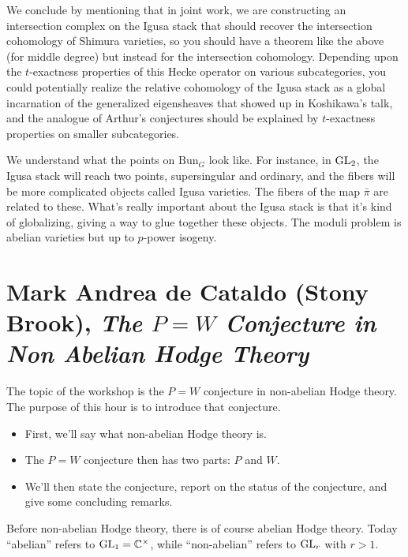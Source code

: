 \documentclass[reqno]{amsart} 
\begin{document}
We conclude by mentioning that in joint work, we are constructing an intersection complex on the Igusa stack that should recover the intersection cohomology of Shimura varieties, so you should have a theorem like the above (for middle degree) but instead for the intersection cohomology.  Depending upon the $t$-exactness properties of this Hecke operator on various subcategories, you could potentially realize the relative cohomology of the Igusa stack as a global incarnation of the generalized eigensheaves that showed up in Koshikawa's talk, and the analogue of Arthur's conjectures should be explained by $t$-exactness properties on smaller subcategories.

\begin{remark}
  We understand what the points on $\mathrm{Bun}_G$ look like.  For instance, in $\operatorname{GL}_2$, the Igusa stack will reach two points, supersingular and ordinary, and the fibers will be more complicated objects called Igusa varieties.  The fibers of the map $\bar{\pi}$ are related to these.  What's really important about the Igusa stack is that it's kind of globalizing, giving a way to glue together these objects.  The moduli problem is abelian varieties but up to $p$-power isogeny.
\end{remark}


\part{Mark Andrea de Cataldo (Stony Brook), \emph{The $P=W$ Conjecture in Non Abelian Hodge Theory}}


The topic of the workshop is the $P = W$ conjecture in non-abelian Hodge theory.  The purpose of this hour is to introduce that conjecture.
\begin{itemize}
\item First, we'll say what non-abelian Hodge theory is.  
\item The $P = W$ conjecture then has two parts: $P$ and $W$.
\item We'll then state the conjecture, report on the status of the conjecture, and give some concluding remarks.
\end{itemize}

Before non-abelian Hodge theory, there is of course abelian Hodge theory.  Today ``abelian'' refers to $\operatorname{GL}_1 = \mathbb{C}^\times$, while ``non-abelian'' refers to $\operatorname{GL}_r$ with $r > 1$.
\end{document}

